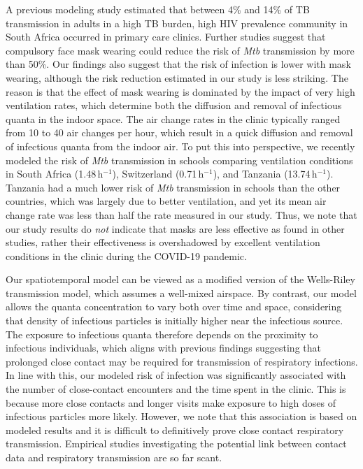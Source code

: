 \documentclass[fleqn,11pt]{wlscirep}
\begin{document}
A previous modeling study estimated that between 4\% and 14\% of TB transmission in adults in a high TB burden, high HIV prevalence community in South Africa occurred in primary care clinics\cite{McCreesh2022BMJGlobalHealth}. Further studies suggest that compulsory face mask wearing could reduce the risk of \emph{Mtb} transmission by more than 50\%\cite{Dharmadhikari2012AJRCCM,McCreesh2021BMJGlobalHealth}. Our findings also suggest that the risk of infection is lower with mask wearing, although the risk reduction estimated in our study is less striking. The reason is that the effect of mask wearing is dominated by the impact of very high ventilation rates, which determine both the diffusion and removal of infectious quanta in the indoor space. The air change rates in the clinic typically ranged from 10 to 40 air changes per hour, which result in a quick diffusion and removal of infectious quanta from the indoor air. To put this into perspective, we recently modeled the risk of \emph{Mtb} transmission in schools comparing ventilation conditions in South Africa (1.48\,h$^{-1}$), Switzerland (0.71\,h$^{-1}$), and Tanzania (13.74\,h$^{-1}$)\cite{Banholzer2024PGPH}. Tanzania had a much lower risk of \emph{Mtb} transmission in schools than the other countries, which was largely due to better ventilation, and yet its mean air change rate was less than half the rate measured in our study. Thus, we note that our study results do \emph{not} indicate that masks are less effective as found in other studies, rather their effectiveness is overshadowed by excellent ventilation conditions in the clinic during the COVID-19 pandemic.

Our spatiotemporal model can be viewed as a modified version of the Wells-Riley transmission model\cite{Riley1978AJE}, which assumes a well-mixed airspace. By contrast, our model allows the quanta concentration to vary both over time and space, considering that density of infectious particles is initially higher near the infectious source\cite{Wang2021Science,Vuorinen2020SafSci,Chen2020BuildEnv}. The exposure to infectious quanta therefore depends on the proximity to infectious individuals, which aligns with previous findings suggesting that prolonged close contact may be required for transmission of respiratory infections\cite{Leung2020NatMed,Brankston2007LancetID,Narasimhan2013PulmonaryMed}. In line with this, our modeled risk of infection was significantly associated with the number of close-contact encounters and the time spent in the clinic. This is because more close contacts and longer visits make exposure to high doses of infectious particles more likely. However, we note that this association is based on modeled results and it is difficult to definitively prove close contact respiratory transmission. Empirical studies investigating the potential link between contact data and respiratory transmission are so far scant\cite{Voirin2015ICHE,Vanhems2013PONE}.
\end{document}
